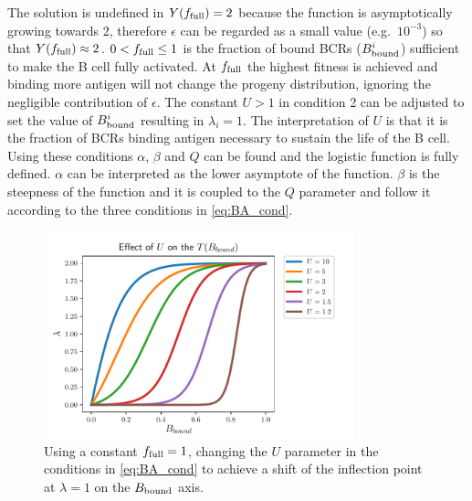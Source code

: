 The solution is undefined in $Y(f_{\text{full}}) = 2$ because the function is asymptotically growing towards 2, therefore $\epsilon$ can be regarded as a small value (e.g.\ $10^{-3}$) so that $Y(f_{\text{full}}) \approx 2$.
$0 < f_{\text{full}} \leq 1$ is the fraction of bound BCRs ($B^i_{\text{bound}}$) sufficient to make the B cell fully activated.
At $f_{\text{full}}$ the highest fitness is achieved and binding more antigen will not change the progeny distribution, ignoring the negligible contribution of $\epsilon$.
The constant $U > 1$ in condition 2 can be adjusted to set the value of $B^i_{\text{bound}}$ resulting in $\lambda_i = 1$.
The interpretation of $U$ is that it is the fraction of BCRs binding antigen necessary to sustain the life of the B cell.
Using these conditions $\alpha$, $\beta$ and $Q$ can be found and the logistic function is fully defined.
$\alpha$ can be interpreted as the lower asymptote of the function.
$\beta$ is the steepness of the function and it is coupled to the $Q$ parameter and follow it according to the three conditions in \eqref{eq:BA_cond}.

\begin{figure}[!ht]
    \centering
    \includegraphics[width=0.8\textwidth]{figures/T_Bbound_U.pdf}
    \caption{
        \label{fig:T_Bbound_U}
        Using a constant $f_{\text{full}} = 1$, changing the $U$ parameter in the conditions in \eqref{eq:BA_cond} to achieve a shift of the inflection point at $\lambda=1$ on the $B_{\text{bound}}$ axis.
    }
\end{figure}

